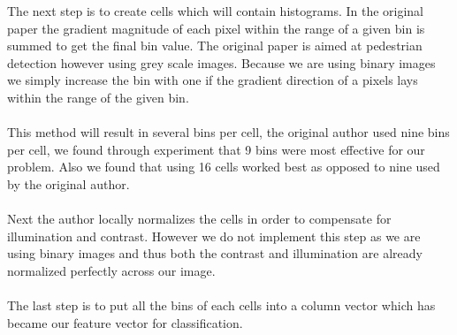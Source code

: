 \documentclass[%
        compressed,
        final,
        notitlepage,
        narroweqnarray,
        inline,
        twoside,
        ]{ieee}
\begin{document}
The next step is to create cells which will contain histograms. In the original paper the gradient magnitude of each pixel within the range of a given bin is summed to get the final bin value. The original paper is aimed at pedestrian detection however using grey scale images. Because we are using binary images we simply increase the bin with one if the gradient direction of a pixels lays within the range of the given bin.\\\\
This method will result in several bins per cell, the original author used nine
bins per cell, we found through experiment that 9 bins were most effective for
our problem. Also we found that using 16 cells worked best as opposed to nine used by the original author.\\\\
Next the author locally normalizes the cells in order to compensate for illumination and contrast. However we do not implement this step as we are using binary images and thus both the contrast and illumination are already normalized perfectly across our image.\\\\
The last step is to put all the bins of each cells into a column vector which has became our feature vector for classification.
\end{document}
